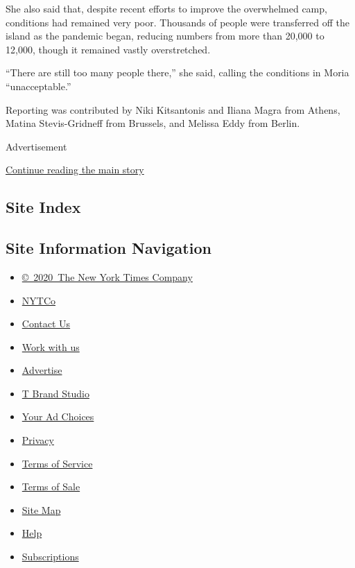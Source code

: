 She also said that, despite recent efforts to improve the overwhelmed
camp, conditions had remained very poor. Thousands of people were
transferred off the island as the pandemic began, reducing numbers from
more than 20,000 to 12,000, though it remained vastly overstretched.

``There are still too many people there,'' she said, calling the
conditions in Moria ``unacceptable.''

Reporting was contributed by Niki Kitsantonis and Iliana Magra from
Athens, Matina Stevis-Gridneff from Brussels, and Melissa Eddy from
Berlin.

Advertisement

\protect\hyperlink{after-bottom}{Continue reading the main story}

\hypertarget{site-index}{%
\subsection{Site Index}\label{site-index}}

\hypertarget{site-information-navigation}{%
\subsection{Site Information
Navigation}\label{site-information-navigation}}

\begin{itemize}
\tightlist
\item
  \href{https://help.nytimes3xbfgragh.onion/hc/en-us/articles/115014792127-Copyright-notice}{©~2020~The
  New York Times Company}
\end{itemize}

\begin{itemize}
\tightlist
\item
  \href{https://www.nytco.com/}{NYTCo}
\item
  \href{https://help.nytimes3xbfgragh.onion/hc/en-us/articles/115015385887-Contact-Us}{Contact
  Us}
\item
  \href{https://www.nytco.com/careers/}{Work with us}
\item
  \href{https://nytmediakit.com/}{Advertise}
\item
  \href{http://www.tbrandstudio.com/}{T Brand Studio}
\item
  \href{https://www.nytimes3xbfgragh.onion/privacy/cookie-policy\#how-do-i-manage-trackers}{Your
  Ad Choices}
\item
  \href{https://www.nytimes3xbfgragh.onion/privacy}{Privacy}
\item
  \href{https://help.nytimes3xbfgragh.onion/hc/en-us/articles/115014893428-Terms-of-service}{Terms
  of Service}
\item
  \href{https://help.nytimes3xbfgragh.onion/hc/en-us/articles/115014893968-Terms-of-sale}{Terms
  of Sale}
\item
  \href{https://spiderbites.nytimes3xbfgragh.onion}{Site Map}
\item
  \href{https://help.nytimes3xbfgragh.onion/hc/en-us}{Help}
\item
  \href{https://www.nytimes3xbfgragh.onion/subscription?campaignId=37WXW}{Subscriptions}
\end{itemize}

